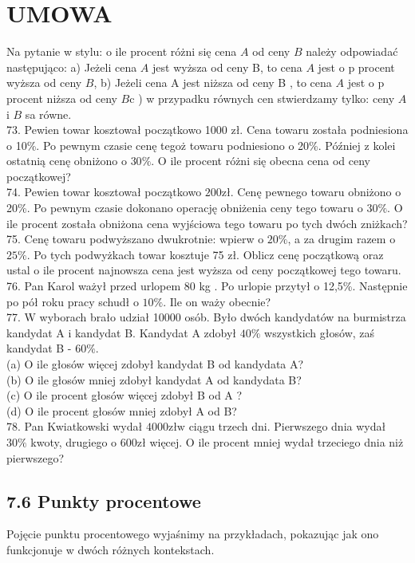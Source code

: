 \documentclass[10pt]{article}
\begin{document}
\section*{UMOWA}
Na pytanie w stylu: o ile procent różni się cena \(A\) od ceny \(B\) należy odpowiadać następująco: a) Jeżeli cena \(A\) jest wyższa od ceny B, to cena \(A\) jest o p procent wyższa od ceny \(B\), b) Jeżeli cena A jest niższa od ceny B , to cena \(A\) jest o p procent niższa od ceny \(B \mathrm{c}\) ) w przypadku równych cen stwierdzamy tylko: ceny \(A\) i \(B\) sa równe.\\
73. Pewien towar kosztował początkowo 1000 zł. Cena towaru została podniesiona o 10\%. Po pewnym czasie cenę tegoż towaru podniesiono o 20\%. Później z kolei ostatnią cenę obniżono o \(30 \%\). O ile procent różni się obecna cena od ceny początkowej?\\
74. Pewien towar kosztował początkowo \(200 \mathrm{zł}\). Cenę pewnego towaru obniżono o 20\%. Po pewnym czasie dokonano operację obniżenia ceny tego towaru o \(30 \%\). O ile procent została obniżona cena wyjściowa tego towaru po tych dwóch zniżkach?\\
75. Cenę towaru podwyższano dwukrotnie: wpierw o \(20 \%\), a za drugim razem o \(25 \%\). Po tych podwyżkach towar kosztuje 75 zł. Oblicz cenę początkową oraz ustal o ile procent najnowsza cena jest wyższa od ceny początkowej tego towaru.\\
76. Pan Karol ważył przed urlopem 80 kg . Po urlopie przytył o 12,5\%. Następnie po pół roku pracy schudł o \(10 \%\). Ile on waży obecnie?\\
77. W wyborach brało udział 10000 osób. Było dwóch kandydatów na burmistrza kandydat A i kandydat B. Kandydat A zdobył \(40 \%\) wszystkich głosów, zaś kandydat B - \(60 \%\).\\
(a) O ile głosów więcej zdobył kandydat B od kandydata A?\\
(b) O ile głosów mniej zdobył kandydat A od kandydata B?\\
(c) O ile procent głosów więcej zdobył B od A ?\\
(d) O ile procent głosów mniej zdobył A od B?\\
78. Pan Kwiatkowski wydał \(4000 \mathrm{zł} \mathrm{w}\) ciągu trzech dni. Pierwszego dnia wydał \(30 \%\) kwoty, drugiego o \(600 \mathrm{zł}\) więcej. O ile procent mniej wydał trzeciego dnia niż pierwszego?

\subsection*{7.6 Punkty procentowe}
Pojęcie punktu procentowego wyjaśnimy na przykładach, pokazując jak ono funkcjonuje w dwóch różnych kontekstach.
\end{document}
